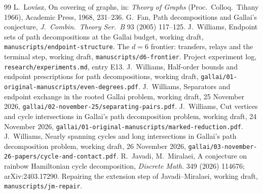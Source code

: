 \documentclass[11pt]{amsart}
\theoremstyle{definition}
\begin{document}
\begin{thebibliography}{99}
 L.~Lov\'asz, On covering of graphs, in: \emph{Theory of Graphs} (Proc.\ Colloq.\
Tihany 1966), Academic Press, 1968, 231--236.
 G.~Fan, Path decompositions and Gallai's conjecture, \emph{J.\ Combin.\ Theory Ser.\
B} 93 (2005) 117--125.
\bibitem{ES} J.~Williams, Endpoint sets of path decompositions at the Gallai budget, working draft,
\texttt{manuscripts/endpoint-structure}.
\bibitem{D6} The $d=6$ frontier: transfers, relays and the terminal step, working draft,
\texttt{manuscripts/d6-frontier}.
\bibitem{EXP} Project experiment log, \texttt{research/experiments.md}, entry E13.
\bibitem{ED} J.~Williams, Half-order bounds and endpoint prescriptions for path decompositions,
working draft,
\texttt{gallai/01-original-manuscripts/even-degrees.pdf}.
\bibitem{SP} J.~Williams, Separators and endpoint exchange in the rooted Gallai problem, working
draft, 25 November 2026, \texttt{gallai/02-november-25/separating-pairs.pdf}.
\bibitem{MR} J.~Williams, Cut vertices and cycle intersections in Gallai's path decomposition
problem, working draft, 24 November 2026,
\texttt{gallai/01-original-manuscripts/marked-reduction.pdf}.
\bibitem{CC} J.~Williams, Nearly spanning cycles and long intersections in Gallai's path
decomposition problem, working draft, 26 November 2026,
\texttt{gallai/03-november-26-papers/cycle-and-contact.pdf}.
\bibitem{JM} R.~Javadi, M.~Miralaei, A conjecture on rainbow Hamiltonian cycle decomposition,
\emph{Discrete Math.} 349 (2026) 114676; arXiv:2403.17290.
\bibitem{JMR} Repairing the extension step of Javadi--Miralaei, working draft,
\texttt{manuscripts/jm-repair}.
\end{thebibliography}
\end{document}
